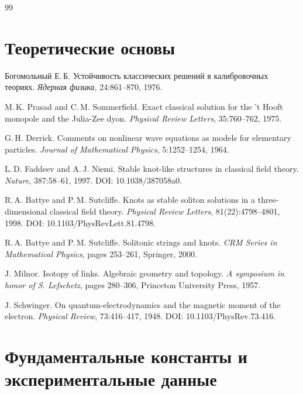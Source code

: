 \documentclass[11pt,a4paper]{article}
\begin{document}
\begin{thebibliography}{99}
	
	\section*{Теоретические основы}
	
	Богомольный Е.\,Б.
	\newblock Устойчивость классических решений в калибровочных теориях.
	\newblock \textit{Ядерная физика}, 24:861--870, 1976.
	
	M.\,K. Prasad and C.\,M. Sommerfield.
	\newblock Exact classical solution for the 't Hooft monopole and the Julia-Zee dyon.
	\newblock \textit{Physical Review Letters}, 35:760--762, 1975.
	
	G.\,H. Derrick.
	\newblock Comments on nonlinear wave equations as models for elementary particles.
	\newblock \textit{Journal of Mathematical Physics}, 5:1252--1254, 1964.
	
	L.\,D. Faddeev and A.\,J. Niemi.
	\newblock Stable knot-like structures in classical field theory.
	\newblock \textit{Nature}, 387:58--61, 1997.
	\newblock DOI: 10.1038/387058a0.
	
	R.\,A. Battye and P.\,M. Sutcliffe.
	\newblock Knots as stable soliton solutions in a three-dimensional classical field theory.
	\newblock \textit{Physical Review Letters}, 81(22):4798--4801, 1998.
	\newblock DOI: 10.1103/PhysRevLett.81.4798.
	
	R.\,A. Battye and P.\,M. Sutcliffe.
	\newblock Solitonic strings and knots.
	\newblock \textit{CRM Series in Mathematical Physics}, pages 253--261, Springer, 2000.
	
	J. Milnor.
	\newblock Isotopy of links. Algebraic geometry and topology.
	\newblock \textit{A symposium in honor of S. Lefschetz}, pages 280--306, Princeton University Press, 1957.
	
	J. Schwinger.
	\newblock On quantum-electrodynamics and the magnetic moment of the electron.
	\newblock \textit{Physical Review}, 73:416--417, 1948.
	\newblock DOI: 10.1103/PhysRev.73.416.
	
	\section*{Фундаментальные константы и экспериментальные данные}
	

\end{thebibliography}
\end{document}
